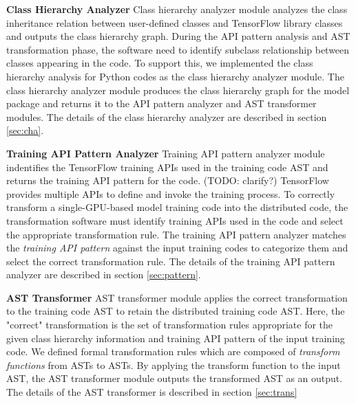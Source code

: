 \textbf{Class Hierarchy Analyzer}
Class hierarchy analyzer module analyzes the class inheritance relation
between user-defined classes and TensorFlow library classes and
outputs the class hierarchy graph.
During the API pattern analysis and AST transformation phase,
the software need to identify subclass relationship between
classes appearing in the code.
To support this, we implemented the class hierarchy analysis
for Python codes as the class hierarchy analyzer module.
The class hierarchy analyzer module produces the class hierarchy graph
for the model package and returns it to the API pattern analyzer and 
AST transformer modules. The details of the class hierarchy analyzer are
described in section \ref{sec:cha}.

\textbf{Training API Pattern Analyzer}
Training API pattern analyzer module 
indentifies the TensorFlow training APIs used in the training code AST
and returns the training API pattern for the code. (TODO: clarify?)
TensorFlow provides multiple APIs to define and invoke the training process.
To correctly transform a single-GPU-based model training code into
the distributed code, the transformation software must identify
training APIs used in the code and select the appropriate transformation rule.
The training API pattern analyzer matches the \textit{training API pattern}
against the input training codes to categorize them and select
the correct transformation rule. The details of the training API pattern
analyzer are described in section \ref{sec:pattern}.

\textbf{AST Transformer}
AST transformer module applies the correct transformation to the
training code AST to retain the distributed training code AST.
Here, the "correct" transformation is the set of transformation rules
appropriate for the given class hierarchy information and
training API pattern of the input training code.
We defined formal transformation rules which are composed of
\textit{transform functions} from ASTs to ASTs.
By applying the transform function to the input AST,
the AST transformer module outputs the transformed AST as an output.
The details of the AST transformer is described in section \ref{sec:trans}
